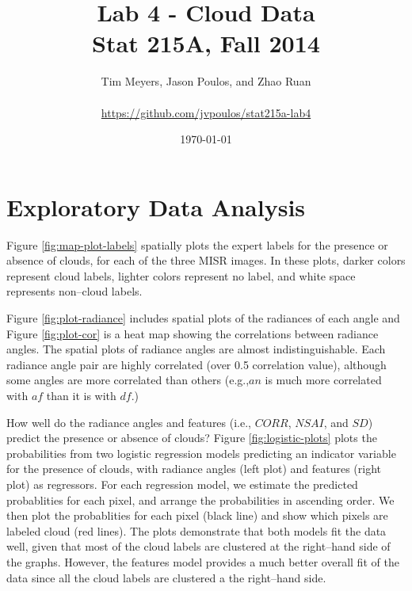 \documentclass[11pt]{article}\usepackage[]{graphicx}\usepackage[]{color}
\begin{document}
\title{Lab 4 - Cloud Data\\
Stat 215A, Fall 2014}
\date{\today}
\author{Tim Meyers, Jason Poulos, and Zhao Ruan \\
\\
\url{https://github.com/jvpoulos/stat215a-lab4}}
\maketitle





\section{Exploratory Data Analysis}

Figure \ref{fig:map-plot-labels} spatially plots the expert labels for the presence or absence of clouds, for each of the three MISR images. In these plots, darker colors represent cloud labels, lighter colors represent no label, and white space represents non--cloud labels. 

Figure \ref{fig:plot-radiance} includes spatial plots of the radiances of each angle and Figure \ref{fig:plot-cor} is a heat map showing the correlations between radiance angles. The spatial plots of radiance angles are almost indistinguishable. Each radiance angle pair are highly correlated (over 0.5 correlation value), although some angles are more correlated than others (e.g.,$an$ is much more correlated with $af$ than it is with $df$.)

How well do the radiance angles and features (i.e., $CORR$, $NSAI$, and $SD$) predict the presence or absence of clouds? Figure \ref{fig:logistic-plots} plots the probabilities from two logistic regression models predicting an indicator variable for the presence of clouds, with radiance angles (left plot) and features (right plot) as regressors. For each regression model, we estimate the predicted probablities for each pixel, and arrange the probabilities in ascending order. We then plot the probablities for each pixel (black line) and show which pixels are labeled cloud (red lines). The plots demonstrate that both models fit the data well, given that most of the cloud labels are clustered at the right--hand side of the graphs. However, the features model provides a much better overall fit of the data since all the cloud labels are clustered a the right--hand side.
\end{document}
